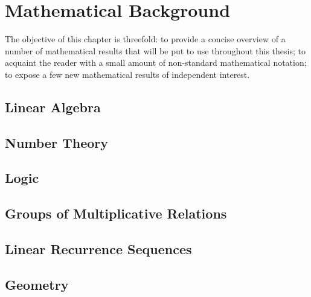 \section{Mathematical Background}
The objective of this chapter is threefold: to provide a concise overview of a number of mathematical results that will be put to use throughout this thesis; to acquaint the reader with a small amount of non-standard mathematical notation; to expose a few new mathematical results of independent interest.
\label{ch:background}
\subsection{Linear Algebra}



\subsection{Number Theory}



\subsection{Logic}


\subsection{Groups of Multiplicative Relations}

\subsection{Linear Recurrence Sequences}

\subsection{Geometry}



